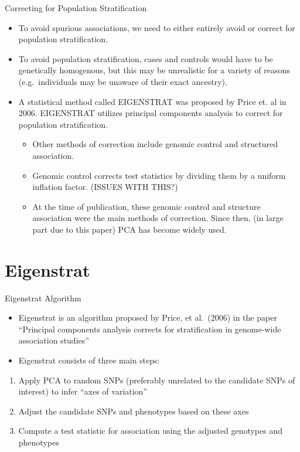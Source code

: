 \documentclass[ignorenonframetext,]{beamer}
\providecommand{\tightlist}{%
  \setlength{\itemsep}{0pt}\setlength{\parskip}{0pt}}
\begin{document}
\begin{frame}{Correcting for Population Stratification}
\protect\hypertarget{correcting-for-population-stratification}{}

\begin{itemize}
\tightlist
\item
  To avoid spurious associations, we need to either entirely avoid or
  correct for population stratification.
\item
  To avoid population stratification, cases and controls would have to
  be genetically homogenous, but this may be unrealistic for a variety
  of reasons (e.g.~individuals may be unaware of their exact ancestry).
\item
  A statistical method called EIGENSTRAT was proposed by Price et. al in
  2006. EIGENSTRAT utilizes principal components analysis to correct for
  population stratification.

  \begin{itemize}
  \tightlist
  \item
    Other methods of correction include genomic control and structured
    association.
  \item
    Genomic control corrects test statistics by dividing them by a
    uniform inflation factor. (ISSUES WITH THIS?)
  \item
    At the time of publication, these genomic control and structure
    association were the main methods of correction. Since then, (in
    large part due to this paper) PCA has become widely used.
  \end{itemize}
\end{itemize}

\end{frame}

\hypertarget{eigenstrat}{%
\section{Eigenstrat}\label{eigenstrat}}

\begin{frame}{Eigenstrat Algorithm}
\protect\hypertarget{eigenstrat-algorithm}{}

\begin{itemize}
\item
  Eigenstrat is an algorithm proposed by Price, et al.~(2006) in the
  paper ``Principal components analysis corrects for stratification in
  genome-wide association studies''
\item
  Eigenstrat consists of three main steps:
\end{itemize}

\begin{enumerate}
\item
  Apply PCA to random SNPs (preferably unrelated to the candidate SNPs
  of interest) to infer ``axes of variation''
\item
  Adjust the candidate SNPs and phenotypes based on these axes
\item
  Compute a test statistic for association using the adjusted genotypes
  and phenotypes
\end{enumerate}

\end{frame}
\end{document}
